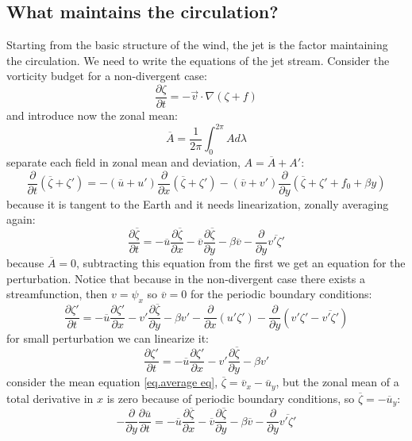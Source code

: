 \subsection{What maintains the circulation?} Starting from the basic structure of the wind, the jet is the factor maintaining the circulation. We need to write the equations of the jet stream. Consider the vorticity budget for a non-divergent case:
\begin{equation}
    \frac{\partial\zeta}{\partial t}=-\vec{v}\cdot\nabla(\zeta+f)
\end{equation}
and introduce now the zonal mean: 
\begin{equation}\label{eq.zonal mean}
    \overline{A}=\frac{1}{2\pi}\int_0^{2\pi}Ad\lambda
\end{equation}
separate each field in zonal mean and deviation, $A=\overline{A}+A'$:
$$\frac{\partial}{\partial t}(\overline{\zeta}+\zeta')=-(\overline{u}+u')\frac{\partial}{\partial x}(\overline{\zeta}+\zeta')-(\overline{v}+v')\frac{\partial}{\partial y}(\overline{\zeta}+\zeta'+f_0+\beta y)$$
because it is tangent to the Earth and it needs linearization, zonally averaging again:
\begin{equation}\label{eq.average eq}
    \frac{\partial\overline{\zeta}}{\partial t}=-\overline{u}\frac{
\partial\overline{\zeta}
}{\partial x}-\overline{v}\frac{\partial\overline{\zeta}}{\partial y}-\beta \overline{v}-\frac{\partial}{\partial y}\overline{v'\zeta'}
\end{equation}
because $\overline{A}=0$, subtracting this equation from the first we get an equation for the perturbation. Notice that because in the non-divergent case there exists a streamfunction, then $v=\psi_x$ so $\overline{v}=0$ for the periodic boundary conditions:
$$\frac{\partial\zeta'}{\partial t}=-\overline{u}\frac{\partial\zeta'}{\partial x}-v'\frac{\partial\overline{\zeta}}{\partial y}-\beta v'-\frac{\partial}{\partial x}(u'\zeta')-\frac{\partial}{\partial y}(v'\zeta'-\overline{v'\zeta'})$$ for small perturbation we can linearize it:
\begin{equation}
    \frac{\partial\zeta'}{\partial t}=-\overline{u}\frac{\partial\zeta'}{\partial x}-v'\frac{\partial\overline{\zeta}}{\partial y}-\beta v'
\end{equation}
consider the mean equation \ref{eq.average eq}, $\overline{\zeta}=\overline{v}_x-\overline{u}_y$, but the zonal mean of a total derivative in $x$ is zero because of periodic boundary conditions, so $\overline{\zeta}=-\overline{u}_y$:
$$-\frac{\partial}{\partial y}\frac{\partial\overline{u}}{\partial t}=-\overline{u}\frac{\partial\overline{\zeta}}{\partial x}-\overline{v}\frac{\partial\overline{\zeta}}{\partial y}-\beta\overline{v}-\frac{\partial}{\partial y}\overline{v'\zeta'}$$
